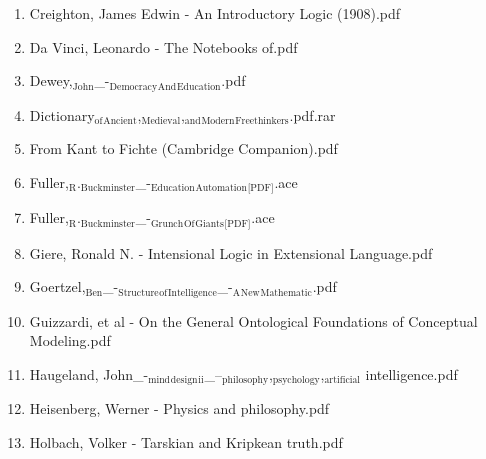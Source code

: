 \documentclass[11pt]{article}
\begin{document}
\begin{enumerate}
\begin{enumerate}
\item Creighton, James Edwin  - An Introductory Logic (1908).pdf
\label{sec-1-1-1-1-34-25-7}

\item Da Vinci, Leonardo - The Notebooks of.pdf
\label{sec-1-1-1-1-34-25-8}

\item Dewey,$_{\text{John}}$\_-$_{\text{Democracy}}$$_{\text{And}}$$_{\text{Education}}$.pdf
\label{sec-1-1-1-1-34-25-9}

\item Dictionary$_{\text{of}}$$_{\text{Ancient}}$,$_{\text{Medieval}}$,$_{\text{and}}$$_{\text{Modern}}$$_{\text{Freethinkers}}$.pdf.rar
\label{sec-1-1-1-1-34-25-10}

\item From Kant to Fichte (Cambridge Companion).pdf
\label{sec-1-1-1-1-34-25-11}

\item Fuller,$_{\text{R}}$.$_{\text{Buckminster}}$\_-$_{\text{Education}}$$_{\text{Automation}}$$_{\text{[PDF]}}$.ace
\label{sec-1-1-1-1-34-25-12}

\item Fuller,$_{\text{R}}$.$_{\text{Buckminster}}$\_-$_{\text{Grunch}}$$_{\text{Of}}$$_{\text{Giants}}$$_{\text{[PDF]}}$.ace
\label{sec-1-1-1-1-34-25-13}

\item Giere, Ronald N. - Intensional Logic in Extensional Language.pdf
\label{sec-1-1-1-1-34-25-14}

\item Goertzel,$_{\text{Ben}}$\_-$_{\text{Structure}}$$_{\text{of}}$$_{\text{Intelligence}}$\_-$_{\text{A}}$$_{\text{New}}$$_{\text{Mathematic}}$.pdf
\label{sec-1-1-1-1-34-25-15}

\item Guizzardi, et al - On the General Ontological Foundations of Conceptual Modeling.pdf
\label{sec-1-1-1-1-34-25-16}

\item Haugeland, John\_-$_{\text{mind}}$$_{\text{design}}$$_{\text{ii}}$\_--$_{\text{philosophy}}$,$_{\text{psychology}}$,$_{\text{artificial}}$ intelligence.pdf
\label{sec-1-1-1-1-34-25-17}

\item Heisenberg, Werner - Physics and philosophy.pdf
\label{sec-1-1-1-1-34-25-18}

\item Holbach, Volker - Tarskian and Kripkean truth.pdf
\label{sec-1-1-1-1-34-25-19}


\end{enumerate}
\end{enumerate}
\end{document}
